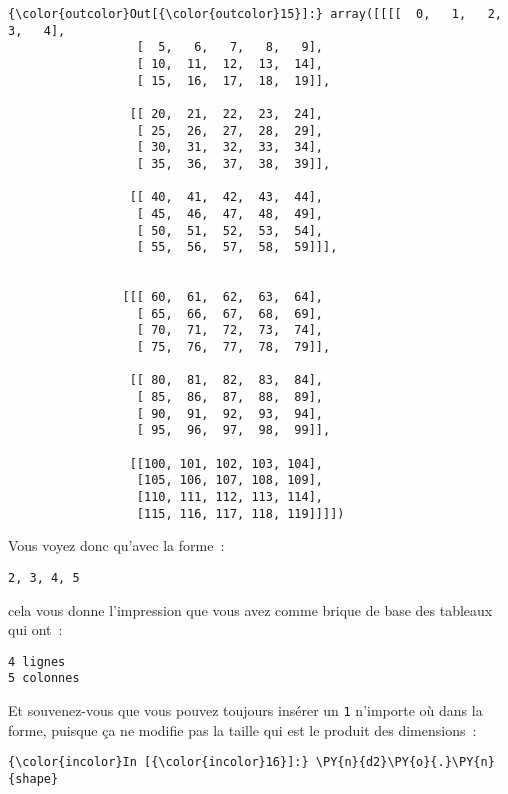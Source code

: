 \begin{Verbatim}[commandchars=\\\{\}]
{\color{outcolor}Out[{\color{outcolor}15}]:} array([[[[  0,   1,   2,   3,   4],
                  [  5,   6,   7,   8,   9],
                  [ 10,  11,  12,  13,  14],
                  [ 15,  16,  17,  18,  19]],
         
                 [[ 20,  21,  22,  23,  24],
                  [ 25,  26,  27,  28,  29],
                  [ 30,  31,  32,  33,  34],
                  [ 35,  36,  37,  38,  39]],
         
                 [[ 40,  41,  42,  43,  44],
                  [ 45,  46,  47,  48,  49],
                  [ 50,  51,  52,  53,  54],
                  [ 55,  56,  57,  58,  59]]],
         
         
                [[[ 60,  61,  62,  63,  64],
                  [ 65,  66,  67,  68,  69],
                  [ 70,  71,  72,  73,  74],
                  [ 75,  76,  77,  78,  79]],
         
                 [[ 80,  81,  82,  83,  84],
                  [ 85,  86,  87,  88,  89],
                  [ 90,  91,  92,  93,  94],
                  [ 95,  96,  97,  98,  99]],
         
                 [[100, 101, 102, 103, 104],
                  [105, 106, 107, 108, 109],
                  [110, 111, 112, 113, 114],
                  [115, 116, 117, 118, 119]]]])
\end{Verbatim}
            
    Vous voyez donc qu'avec la forme~:

\begin{verbatim}
2, 3, 4, 5
\end{verbatim}

cela vous donne l'impression que vous avez comme brique de base des
tableaux qui ont~:

\begin{verbatim}
4 lignes
5 colonnes
\end{verbatim}

    Et souvenez-vous que vous pouvez toujours insérer un \texttt{1}
n'importe où dans la forme, puisque ça ne modifie pas la taille qui est
le produit des dimensions~:

    \begin{Verbatim}[commandchars=\\\{\}]
{\color{incolor}In [{\color{incolor}16}]:} \PY{n}{d2}\PY{o}{.}\PY{n}{shape}
\end{Verbatim}


